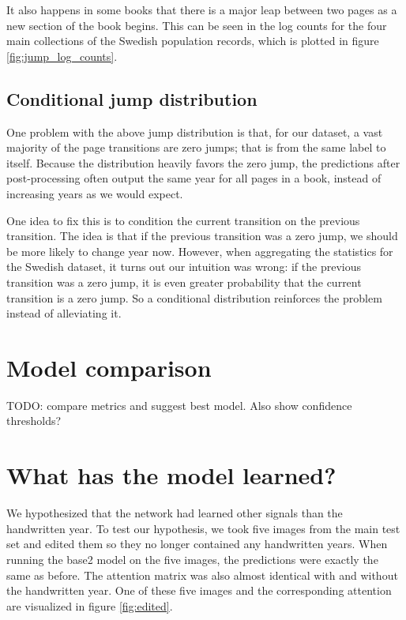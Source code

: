 It also happens in some books that there is a major leap between two pages as a new section of the book begins. This can be seen in the log counts for the four main collections of the Swedish population records, which is plotted in figure \ref{fig:jump_log_counts}.

\subsection{Conditional jump distribution}
One problem with the above jump distribution is that, for our dataset, a vast majority of the page transitions are zero jumps; that is from the same label to itself.
Because the distribution heavily favors the zero jump, the predictions after post-processing often output the same year for all pages in a book, instead of increasing years as we would expect.

One idea to fix this is to condition the current transition on the previous transition. The idea is that if the previous transition was a zero jump, we should be more likely to change year now. However, when aggregating the statistics for the Swedish dataset, it turns out our intuition was wrong: if the previous transition was a zero jump, it is even greater probability that the current transition is a zero jump. So a conditional distribution reinforces the problem instead of alleviating it.


\section{Model comparison}



TODO: compare metrics and suggest best model. Also show confidence thresholds?

\section{What has the model learned?}




We hypothesized that the network had learned other signals than the handwritten year. To test our hypothesis, we took five images from the main test set and edited them so they no longer contained any handwritten years. When running the base2 model on the five images, the predictions were exactly the same as before. The attention matrix was also almost identical with and without the handwritten year. One of these five images and the corresponding attention are visualized in figure \ref{fig:edited}.


